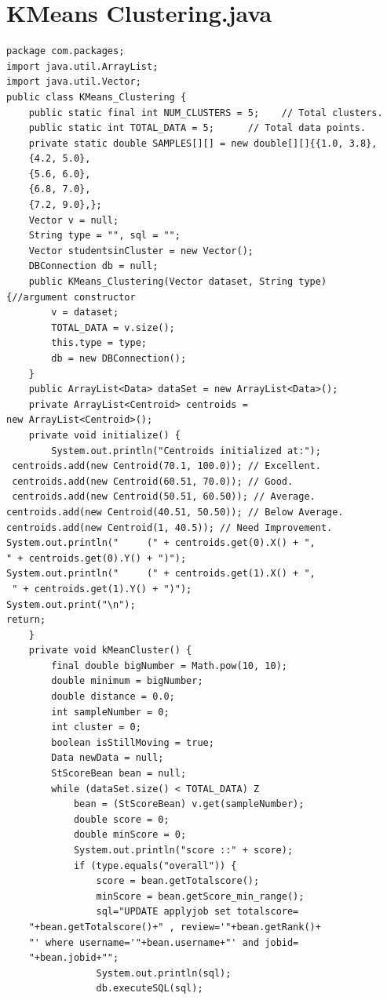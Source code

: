 \documentclass[12pt,a4paper,final]{extreport}
\begin{document}
\section{ KMeans Clustering.java}
\begin{lstlisting}
package com.packages;
import java.util.ArrayList;
import java.util.Vector;
public class KMeans_Clustering {
    public static final int NUM_CLUSTERS = 5;    // Total clusters.
    public static int TOTAL_DATA = 5;      // Total data points.
    private static double SAMPLES[][] = new double[][]{{1.0, 3.8},
    {4.2, 5.0},
    {5.6, 6.0},
    {6.8, 7.0},
    {7.2, 9.0},};
    Vector v = null;
    String type = "", sql = "";
    Vector studentsinCluster = new Vector();
    DBConnection db = null;
    public KMeans_Clustering(Vector dataset, String type)
{//argument constructor
        v = dataset;
        TOTAL_DATA = v.size();
        this.type = type;
        db = new DBConnection();
    }
    public ArrayList<Data> dataSet = new ArrayList<Data>();
    private ArrayList<Centroid> centroids = 
new ArrayList<Centroid>();
    private void initialize() {
        System.out.println("Centroids initialized at:");
 centroids.add(new Centroid(70.1, 100.0)); // Excellent.
 centroids.add(new Centroid(60.51, 70.0)); // Good.
 centroids.add(new Centroid(50.51, 60.50)); // Average.
centroids.add(new Centroid(40.51, 50.50)); // Below Average.
centroids.add(new Centroid(1, 40.5)); // Need Improvement.
System.out.println("     (" + centroids.get(0).X() + ",
" + centroids.get(0).Y() + ")");
System.out.println("     (" + centroids.get(1).X() + ",
 " + centroids.get(1).Y() + ")");
System.out.print("\n");
return;
    }
    private void kMeanCluster() {
        final double bigNumber = Math.pow(10, 10);  
        double minimum = bigNumber;                  
        double distance = 0.0;                      
        int sampleNumber = 0;
        int cluster = 0;
        boolean isStillMoving = true;
        Data newData = null;
        StScoreBean bean = null;
        while (dataSet.size() < TOTAL_DATA) Z
            bean = (StScoreBean) v.get(sampleNumber);
            double score = 0;
            double minScore = 0;
            System.out.println("score ::" + score);
            if (type.equals("overall")) {
                score = bean.getTotalscore();
                minScore = bean.getScore_min_range();
                sql="UPDATE applyjob set totalscore=
	"+bean.getTotalscore()+" , review='"+bean.getRank()+
	"' where username='"+bean.username+"' and jobid=
	"+bean.jobid+"";
                System.out.println(sql);
                db.executeSQL(sql);

\end{lstlisting}
\end{document}
